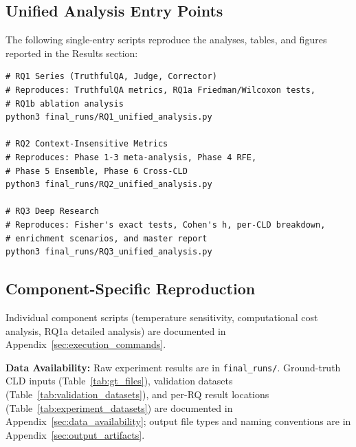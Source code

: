 \subsection{Unified Analysis Entry Points}
The following single-entry scripts reproduce the analyses, tables, and figures reported in the Results section:

\begin{verbatim}
# RQ1 Series (TruthfulQA, Judge, Corrector)
# Reproduces: TruthfulQA metrics, RQ1a Friedman/Wilcoxon tests,
# RQ1b ablation analysis
python3 final_runs/RQ1_unified_analysis.py

# RQ2 Context-Insensitive Metrics
# Reproduces: Phase 1-3 meta-analysis, Phase 4 RFE,
# Phase 5 Ensemble, Phase 6 Cross-CLD
python3 final_runs/RQ2_unified_analysis.py

# RQ3 Deep Research
# Reproduces: Fisher's exact tests, Cohen's h, per-CLD breakdown,
# enrichment scenarios, and master report
python3 final_runs/RQ3_unified_analysis.py
\end{verbatim}

\subsection{Component-Specific Reproduction}

Individual component scripts (temperature sensitivity, computational cost analysis, RQ1a detailed analysis) are documented in Appendix~\ref{sec:execution_commands}.

\textbf{Data Availability:} Raw experiment results are in \texttt{final\_runs/}. Ground-truth CLD inputs (Table~\ref{tab:gt_files}), validation datasets (Table~\ref{tab:validation_datasets}), and per-RQ result locations (Table~\ref{tab:experiment_datasets}) are documented in Appendix~\ref{sec:data_availability}; output file types and naming conventions are in Appendix~\ref{sec:output_artifacts}.